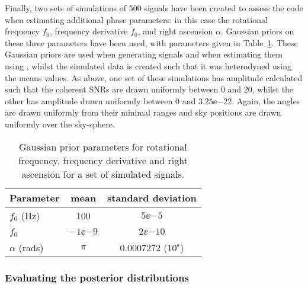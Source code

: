 Finally, two sets of simulations of 500 signals have been created to assess the code when estimating additional phase parameters: in this case
the rotational frequency $f_0$, frequency derivative $\dot{f}_0$, and right ascension $\alpha$. Gaussian priors on these three parameters have been
used, with parameters given in Table~\ref{tab:gaussianpriors}. These Gaussian priors are used when generating signals and when estimating them
using \lppen, whilst the simulated data is created such that it was heterodyned using the means values. As above, one set of these simulations has amplitude 
calculated such that the coherent SNRs are drawn uniformly between 0 and 20, whilst the other has amplitude drawn uniformly between 0 and $3.25\ee{-22}$.
Again, the angles are drawn uniformly from their minimal ranges and sky positions are drawn uniformly over the sky-sphere.

\begin{table}[!hptb]
\caption{Gaussian prior parameters for rotational frequency, frequency derivative and right ascension for a set of simulated signals.
\label{tab:gaussianpriors}}
\begin{center}
\begin{tabular}{l | c c}
\hline
Parameter & mean & standard deviation \\                      
\hline
\hline
$f_0$ (Hz) & 100 & $5\ee{-5}$ \\
$\dot{f}_0$ & $-1\ee{-9}$ & $2\ee{-10}$ \\
$\alpha$ (rads) & $\pi$ & $0.0007272$ ($10^{\text{s}}$) \\
\hline
\end{tabular}
\end{center}
\end{table}

\subsubsection{Evaluating the posterior distributions}\label{sec:ppplots}

